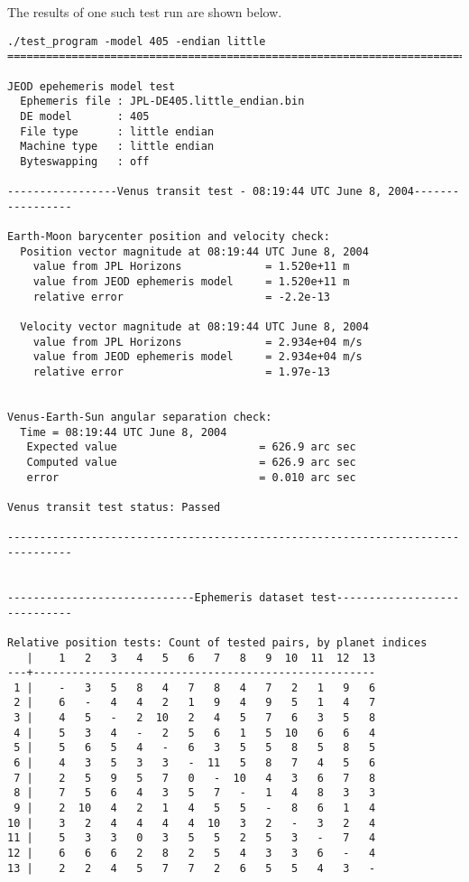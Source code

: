 \begin{description}
The results of one such test run are shown below. 
\begin{verbatim}
./test_program -model 405 -endian little
================================================================================

JEOD epehemeris model test
  Ephemeris file : JPL-DE405.little_endian.bin
  DE model       : 405
  File type      : little endian
  Machine type   : little endian
  Byteswapping   : off

-----------------Venus transit test - 08:19:44 UTC June 8, 2004-----------------

Earth-Moon barycenter position and velocity check:
  Position vector magnitude at 08:19:44 UTC June 8, 2004
    value from JPL Horizons             = 1.520e+11 m
    value from JEOD ephemeris model     = 1.520e+11 m
    relative error                      = -2.2e-13

  Velocity vector magnitude at 08:19:44 UTC June 8, 2004
    value from JPL Horizons             = 2.934e+04 m/s
    value from JEOD ephemeris model     = 2.934e+04 m/s
    relative error                      = 1.97e-13


Venus-Earth-Sun angular separation check:
  Time = 08:19:44 UTC June 8, 2004
   Expected value                      = 626.9 arc sec
   Computed value                      = 626.9 arc sec
   error                               = 0.010 arc sec

Venus transit test status: Passed

--------------------------------------------------------------------------------


-----------------------------Ephemeris dataset test-----------------------------

Relative position tests: Count of tested pairs, by planet indices
   |    1   2   3   4   5   6   7   8   9  10  11  12  13
---+-----------------------------------------------------
 1 |    -   3   5   8   4   7   8   4   7   2   1   9   6
 2 |    6   -   4   4   2   1   9   4   9   5   1   4   7
 3 |    4   5   -   2  10   2   4   5   7   6   3   5   8
 4 |    5   3   4   -   2   5   6   1   5  10   6   6   4
 5 |    5   6   5   4   -   6   3   5   5   8   5   8   5
 6 |    4   3   5   3   3   -  11   5   8   7   4   5   6
 7 |    2   5   9   5   7   0   -  10   4   3   6   7   8
 8 |    7   5   6   4   3   5   7   -   1   4   8   3   3
 9 |    2  10   4   2   1   4   5   5   -   8   6   1   4
10 |    3   2   4   4   4   4  10   3   2   -   3   2   4
11 |    5   3   3   0   3   5   5   2   5   3   -   7   4
12 |    6   6   6   2   8   2   5   4   3   3   6   -   4
13 |    2   2   4   5   7   7   2   6   5   5   4   3   -


\end{verbatim}
\end{description}
